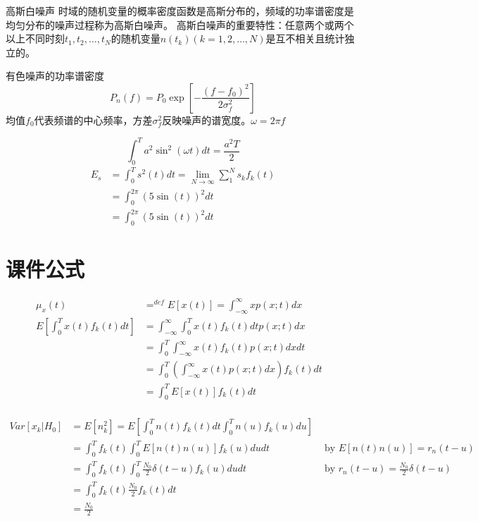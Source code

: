 \begin{frame}
\begin{block}{高斯白噪声}
	时域的随机变量的概率密度函数是高斯分布的，频域的功率谱密度是均匀分布的噪声过程称为高斯白噪声。
	高斯白噪声的重要特性：任意两个或两个以上不同时刻$t_1,t_2,\dots,t_N$的随机变量$n(t_k) (k=1,2,\dots,N)$是互不相关且统计独立的。
\end{block}
\begin{block}{有色噪声的功率谱密度}
	\[P_n(f) =P_0\exp[-\frac{(f-f_0)^2}{2\sigma_f^2}]\]
	均值$f_0$代表频谱的中心频率，方差$\sigma_f^2$反映噪声的谱宽度。$\omega=2\pi f$
\end{block}
\end{frame}

\begin{frame}
\[\int_{0}^{T}a^2\sin^2(\omega t)dt=\frac{a^2T}{2}\]
\begin{align*}
E_s&=\int_{0}^{T}s^2(t)dt=\lim\limits_{N\to \infty}\sum_{1}^{N}s_kf_k(t)\\
&=\int_{0}^{2\pi}(5\sin(t))^2dt\\
&=\int_{0}^{2\pi}(5\sin(t))^2dt
\end{align*}
\end{frame}

\section{课件公式}

\begin{frame}
\begin{align*}
\mu_x(t)&\mathop{=}^{def}E[x(t)]=\int_{-\infty}^{\infty}xp(x;t)dx&\\
E[\int_{0}^{T}x(t)f_k(t)dt]&=\int_{-\infty}^{\infty}\int_{0}^{T}x(t)f_k(t)dtp(x;t)dx\\
&=\int_{0}^{T}\int_{-\infty}^{\infty}x(t)f_k(t)p(x;t)dxdt\\
&=\int_{0}^{T}\left(\int_{-\infty}^{\infty}x(t)p(x;t)dx\right)f_k(t)dt\\
&=\int_{0}^{T}E[x(t)]f_k(t)dt\\
\end{align*}
\end{frame}


\begin{frame}
\begin{align*}
Var[x_k|H_0]&=E[n_k^2]=E[\int_{0}^{T}n(t)f_k(t)dt\int_{0}^{T}n(u)f_k(u)du]&\\
&=\int_{0}^{T}f_k(t)\int_{0}^{T}E[n(t)n(u)]f_k(u)dudt& \text{ by }E[n(t)n(u)]=r_n(t-u)\\
&=\int_{0}^{T}f_k(t)\int_{0}^{T}\frac{N_0}{2}\delta(t-u)f_k(u)dudt&\text{ by } r_n(t-u)=\frac{N_0}{2}\delta(t-u)\\
&=\int_{0}^{T}f_k(t)\frac{N_0}{2}f_k(t)dt&\\
&=\frac{N_0}{2}&
\end{align*}
\end{frame}

